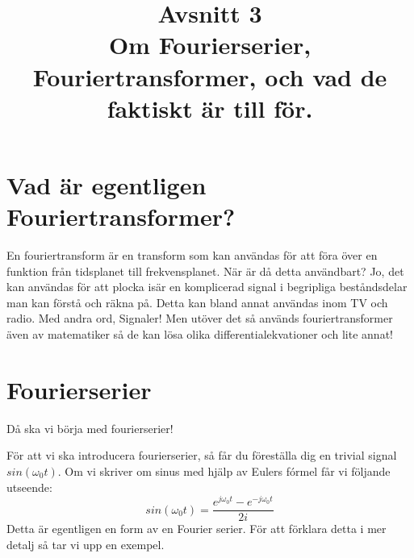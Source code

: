 \documentclass{article}
\title{Avsnitt 3 \\
\large Om Fourierserier, Fouriertransformer, och vad de faktiskt är till för.}
\author{ }
\date{}
\begin{document}
\maketitle

\section{Vad är egentligen Fouriertransformer?}
En fouriertransform är en transform som kan användas för att föra över en funktion från tidsplanet till frekvensplanet. När är då detta användbart? Jo, det kan användas för att plocka isär en komplicerad signal i begripliga beståndsdelar man kan förstå och räkna på. Detta kan bland annat användas inom TV och radio. Med andra ord, Signaler! Men utöver det så används fouriertransformer även av matematiker så de kan lösa olika differentialekvationer och lite annat!



\section{Fourierserier}

Då ska vi börja med fourierserier!

För att vi ska introducera fourierserier, så får du föreställa dig en trivial signal $sin(\omega_0 t)$. Om vi skriver om sinus med hjälp av Eulers fórmel får vi följande utseende:
$$sin(\omega_0 t) = \frac{e^{j \omega_0 t}  - e^{-j \omega_0 t}}{2i}$$
Detta är egentligen en form av en Fourier serier. För att förklara detta i mer detalj så tar vi upp en exempel.
\end{document}
